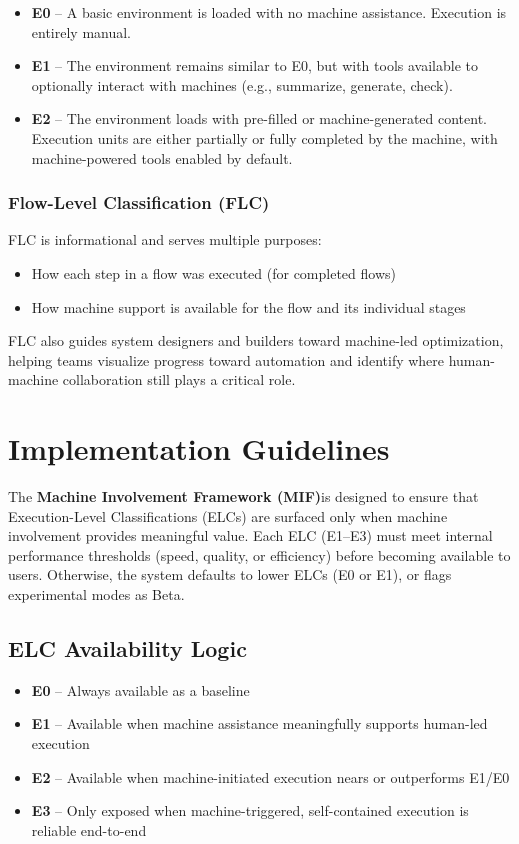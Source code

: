 \documentclass[12pt,a4paper]{article}
\newcommand{\mif}{\textbf{Machine Involvement Framework (MIF)}}
\begin{document}
\begin{itemize}
\item \textbf{E0} – A basic environment is loaded with no machine assistance. Execution is entirely manual.
\item \textbf{E1} – The environment remains similar to E0, but with tools available to optionally interact with machines (e.g., summarize, generate, check).
\item \textbf{E2} – The environment loads with pre-filled or machine-generated content. Execution units are either partially or fully completed by the machine, with machine-powered tools enabled by default.
\end{itemize}

\subsubsection{Flow-Level Classification (FLC)}

FLC is informational and serves multiple purposes:

\begin{itemize}
\item How each step in a flow was executed (for completed flows)
\item How machine support is available for the flow and its individual stages
\end{itemize}

FLC also guides system designers and builders toward machine-led optimization, helping teams visualize progress toward automation and identify where human-machine collaboration still plays a critical role.

\section{Implementation Guidelines}

The \mif is designed to ensure that Execution-Level Classifications (ELCs) are surfaced only when machine involvement provides meaningful value. Each ELC (E1–E3) must meet internal performance thresholds (speed, quality, or efficiency) before becoming available to users. Otherwise, the system defaults to lower ELCs (E0 or E1), or flags experimental modes as Beta.

\subsection{ELC Availability Logic}

\begin{itemize}
\item \textbf{E0} – Always available as a baseline
\item \textbf{E1} – Available when machine assistance meaningfully supports human-led execution
\item \textbf{E2} – Available when machine-initiated execution nears or outperforms E1/E0
\item \textbf{E3} – Only exposed when machine-triggered, self-contained execution is reliable end-to-end
\end{itemize}
\end{document}
